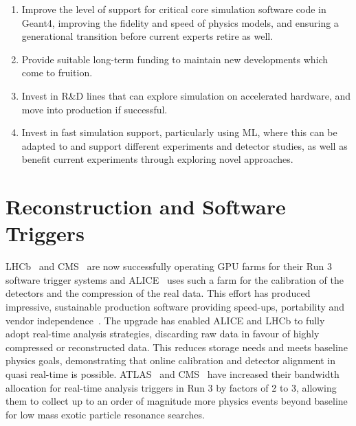 \documentclass[10pt,a4paper]{article}
\begin{document}
\begin{enumerate}
\def\labelenumi{\arabic{enumi}.}
\item
  Improve the level of support for critical core simulation software code in
  Geant4, improving the fidelity and speed of physics models, and ensuring a
  generational transition before current experts retire as well.
\item
  Provide suitable long-term funding to maintain new developments which
  come to fruition.
\item
  Invest in R\&D lines that can explore simulation on accelerated
  hardware, and move into production if successful.
\item
  Invest in fast simulation support, particularly using ML, where this
  can be adapted to and support different experiments and detector
  studies, as well as benefit current experiments through exploring
  novel approaches.
\end{enumerate}

\section{Reconstruction and Software
Triggers}\label{reconstruction-and-software-triggers}

LHCb~\cite{LHCb:RTDP} and CMS~\cite{CMS:Detector_R3}
are now successfully operating GPU farms for their
Run 3 software trigger systems and ALICE~\cite{ALICE:LS2_upgrades} uses such a farm for
the calibration of the detectors and the compression of the real data. This
effort has produced impressive, sustainable production software providing
speed-ups, portability and vendor
independence~\cite{Concas:2024cyu, Aaij2020Allen,MathesP3MA2017}. The
upgrade has enabled ALICE and LHCb to fully adopt real-time analysis strategies,
discarding raw data in favour of highly compressed or reconstructed
data. This reduces storage needs and meets baseline physics goals, demonstrating that
online calibration and detector alignment in quasi real-time is possible.
ATLAS~\cite{ATLAS:trigger_LS3} and CMS~\cite{CMS:enriching_phys_programs}
have increased their bandwidth allocation for real-time
analysis triggers in Run 3 by factors of 2 to 3, allowing them to
collect up to an order of magnitude more physics events beyond
baseline for low mass exotic particle resonance searches.
\end{document}
